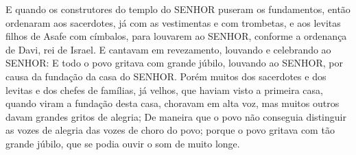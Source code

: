 {  E quando os construtores do templo do SENHOR puseram os fundamentos, então ordenaram aos sacerdotes, já com as vestimentas e com trombetas, e aos levitas filhos de Asafe com címbalos, para louvarem ao SENHOR, conforme a ordenança de Davi, rei de Israel.
  E cantavam em revezamento, louvando e celebrando ao SENHOR:  E todo o povo gritava com grande júbilo, louvando ao SENHOR, por causa da fundação da casa do SENHOR.
  Porém muitos dos sacerdotes e dos levitas e dos chefes de famílias, já velhos, que haviam visto a primeira casa, quando viram a fundação desta casa, choravam em alta voz, mas muitos outros davam grandes gritos de alegria;
  De maneira que o povo não conseguia distinguir as vozes de alegria das vozes de choro do povo; porque o povo gritava com tão grande júbilo, que se podia ouvir o som de muito longe.
\par }

